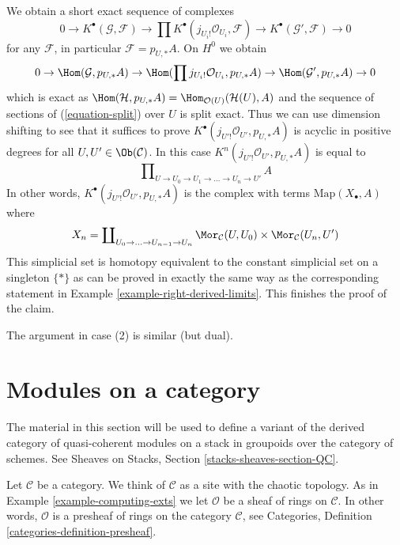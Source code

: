 \begin{example}
We obtain a short exact sequence of complexes
$$
0 \to
K^\bullet(\mathcal{G}, \mathcal{F}) \to
\prod K^\bullet(j_{U_i!}\mathcal{O}_{U_i}, \mathcal{F}) \to
K^\bullet(\mathcal{G}', \mathcal{F}) \to 0
$$
for any $\mathcal{F}$, in particular $\mathcal{F} = p_{U, *}A$.
On $H^0$ we obtain
$$
0 \to \Hom(\mathcal{G}, p_{U, *}A) \to
\Hom(\prod j_{U_i!}\mathcal{O}_{U_i}, p_{U, *}A) \to
\Hom(\mathcal{G}', p_{U, *}A) \to 0
$$
which is exact as
$\Hom(\mathcal{H}, p_{U, *}A) = \Hom_{\mathcal{O}(U)}(\mathcal{H}(U), A)$
and the sequence of sections of (\ref{equation-split}) over $U$ is split exact.
Thus we can use dimension shifting to see that it suffices to prove
$K^\bullet(j_{U'!}\mathcal{O}_{U'}, p_{U, *}A)$ is acyclic in positive
degrees for all $U, U' \in \Ob(\mathcal{C})$. In this case
$K^n(j_{U'!}\mathcal{O}_{U'}, p_{U, *}A)$ is equal to
$$
\prod\nolimits_{U \to U_0 \to U_1 \to \ldots \to U_n \to U'} A
$$
In other words, $K^\bullet(j_{U'!}\mathcal{O}_{U'}, p_{U, *}A)$
is the complex with terms $\text{Map}(X_\bullet, A)$ where
$$
X_n = \coprod\nolimits_{U_0 \to \ldots \to U_{n - 1} \to U_n}
\Mor_\mathcal{C}(U, U_0) \times \Mor_\mathcal{C}(U_n, U')
$$
This simplicial set is homotopy equivalent to the constant simplicial
set on a singleton $\{*\}$ as can be proved in exactly the same way
as the corresponding statement in Example \ref{example-right-derived-limits}.
This finishes the proof of the claim.

\medskip\noindent
The argument in case (2) is similar (but dual).
\end{example}






\section{Modules on a category}
\label{section-modules-cohomology}

\noindent
The material in this section will be used to define a variant of the
derived category of quasi-coherent modules on a stack in groupoids
over the category of schemes. See
Sheaves on Stacks, Section \ref{stacks-sheaves-section-QC}.

\medskip\noindent
Let $\mathcal{C}$ be a category. We think of $\mathcal{C}$ as a site with
the chaotic topology. As in Example \ref{example-computing-exts} we let
$\mathcal{O}$ be a sheaf of rings on $\mathcal{C}$.
In other words, $\mathcal{O}$ is
a presheaf of rings on the category $\mathcal{C}$, see
Categories, Definition \ref{categories-definition-presheaf}.

